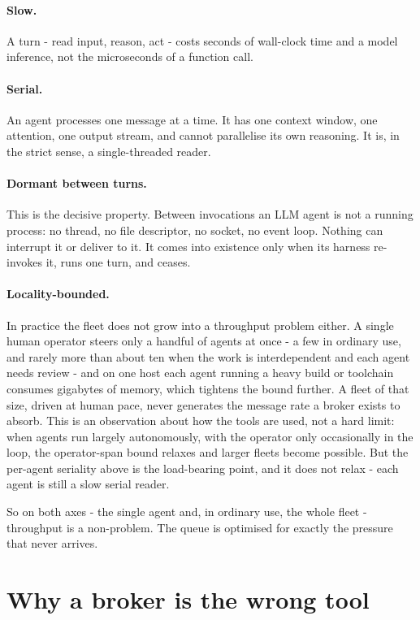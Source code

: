 \documentclass[11pt]{article}
\begin{document}
\paragraph{Slow.} A turn - read input, reason, act - costs seconds of wall-clock time and a model inference, not the microseconds of a function call.

\paragraph{Serial.} An agent processes one message at a time. It has one context window, one attention, one output stream, and cannot parallelise its own reasoning. It is, in the strict sense, a single-threaded reader.

\paragraph{Dormant between turns.} This is the decisive property. Between invocations an LLM agent is not a running process: no thread, no file descriptor, no socket, no event loop. Nothing can interrupt it or deliver to it. It comes into existence only when its harness re-invokes it, runs one turn, and ceases.

\paragraph{Locality-bounded.} In practice the fleet does not grow into a throughput problem either. A single human operator steers only a handful of agents at once - a few in ordinary use, and rarely more than about ten when the work is interdependent and each agent needs review - and on one host each agent running a heavy build or toolchain consumes gigabytes of memory, which tightens the bound further. A fleet of that size, driven at human pace, never generates the message rate a broker exists to absorb. This is an observation about how the tools are used, not a hard limit: when agents run largely autonomously, with the operator only occasionally in the loop, the operator-span bound relaxes and larger fleets become possible. But the per-agent seriality above is the load-bearing point, and it does not relax - each agent is still a slow serial reader.

So on both axes - the single agent and, in ordinary use, the whole fleet - throughput is a non-problem. The queue is optimised for exactly the pressure that never arrives.

\section{Why a broker is the wrong tool}
\end{document}
